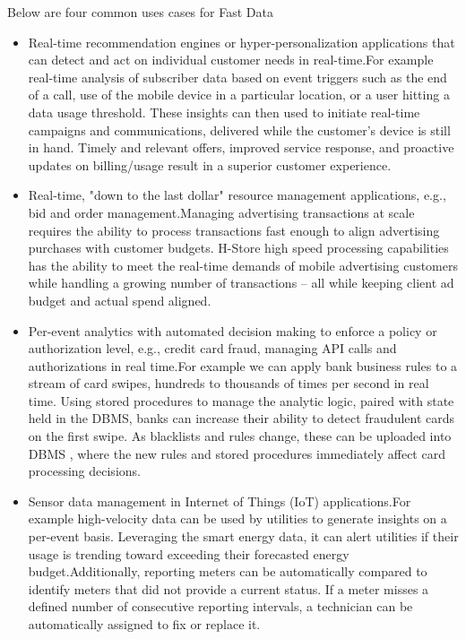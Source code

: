 \documentclass[9pt,twocolumn,twoside]{styles/osajnl}
\begin{document}
Below are four common uses cases for Fast Data 
\begin{itemize}
\renewcommand{\labelitemi}{\scriptsize$\bullet$} 
\item Real-time recommendation engines or hyper-personalization applications that can detect and act on individual customer needs in real-time.For example real-time analysis of subscriber data based on event triggers such as the end of a call, use of the mobile device in a particular location, or a user hitting a data usage threshold. These insights can then used to initiate real-time campaigns and communications, delivered while the customer’s device is still in hand. Timely and relevant offers, improved service response, and proactive updates on billing/usage result in a superior customer experience.
\item Real-time, "down to the last dollar" resource management applications, e.g., bid and order management.Managing advertising transactions at scale requires the ability to process transactions fast enough to align advertising purchases with customer budgets. H-Store high speed processing capabilities has the ability to meet the real-time demands of mobile advertising customers while handling a growing number of transactions – all while keeping client ad budget and actual spend aligned.
\item Per-event analytics with automated decision making to enforce a policy or authorization level, e.g., credit card fraud, managing API calls and authorizations in real time.For example we can apply bank business rules to a stream of card swipes, hundreds to thousands of times per second in real time. Using stored procedures to manage the analytic logic, paired with state held in the DBMS, banks can increase their ability to detect fraudulent cards on the first swipe. As blacklists and rules change, these can be uploaded into DBMS , where the new rules and stored procedures immediately affect card processing decisions.
\item Sensor data management in Internet of Things (IoT) applications.For example high-velocity data can be used by utilities to generate insights on a per-event basis. Leveraging the smart energy data, it can alert utilities if their usage is trending toward exceeding their forecasted energy budget.Additionally, reporting meters can be automatically compared to identify meters that did not provide a current status. If a meter misses a defined number of consecutive reporting intervals, a technician can be automatically assigned to fix or replace it.
\end{itemize}
\end{document}
